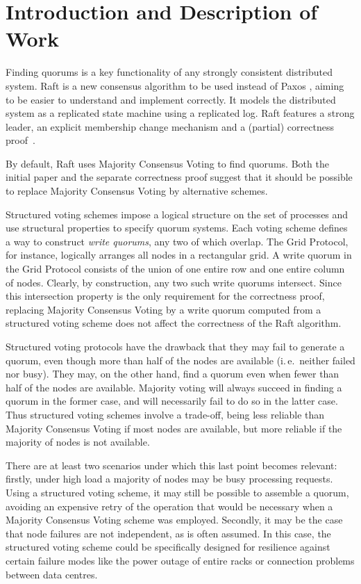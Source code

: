 \documentclass[12pt,chapterprefix=true,toc=bibliography,numbers=noendperiod,
               footnotes=multiple,twoside]{scrreprt}
\begin{document}
\section*{Introduction and Description of Work%
  \label{introduction-and-description-of-work}%
}

Finding quorums is a key functionality of any strongly consistent distributed system. Raft \autocite{raft} is a new consensus algorithm to be used instead of Paxos \autocite{paxos}, aiming to be easier to understand and implement correctly. It models the distributed system as a replicated state machine using a replicated log. Raft features a strong leader, an explicit membership change mechanism and a (partial) correctness proof~\autocite{raftproof}.

By default, Raft uses Majority Consensus Voting to find quorums. Both the initial paper and the separate correctness proof suggest that it should be possible to replace Majority Consensus Voting by alternative schemes.

Structured voting schemes \autocite{voting} impose a logical structure on the set of processes and use structural properties to specify quorum systems. Each voting scheme defines a way to construct \emph{write quorums}, any two of which overlap. The Grid Protocol, for instance, logically arranges all nodes in a rectangular grid. A write quorum in the Grid Protocol consists of the union of one entire row and one entire column of nodes. Clearly, by construction, any two such write quorums intersect. Since this intersection property is the only requirement for the correctness proof, replacing Majority Consensus Voting by a write quorum computed from a structured voting scheme does not affect the correctness of the Raft algorithm.

Structured voting protocols have the drawback that they may fail to generate a quorum, even though more than half of the nodes are available (i.\,e.\ neither failed nor busy). They may, on the other hand, find a quorum even when fewer than half of the nodes are available. Majority voting will always succeed in finding a quorum in the former case, and will necessarily fail to do so in the latter case. Thus structured voting schemes involve a trade-off, being less reliable than Majority Consensus Voting if most nodes are available, but more reliable if the majority of nodes is not available.

There are at least two scenarios under which this last point becomes relevant: firstly, under high load a majority of nodes may be busy processing requests. Using a structured voting scheme, it may still be possible to assemble a quorum, avoiding an expensive retry of the operation that would be necessary when a Majority Consensus Voting scheme was employed. Secondly, it may be the case that node failures are not independent, as is often assumed. In this case, the structured voting scheme could be specifically designed for resilience against certain failure modes like the power outage of entire racks or connection problems between data centres.
\end{document}
